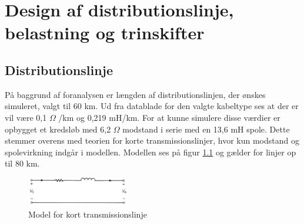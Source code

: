 
\chapter{Design af distributionslinje, belastning og trinskifter}

\section{Distributionslinje}
På baggrund af foranalysen er længden af distributionslinjen, der ønskes simuleret, valgt til 60 km. Ud fra datablade for den valgte kabeltype ses at der er vil være 0,1 $\Omega$ /km og 0,219 mH/km. For at kunne simulere disse værdier er opbygget et kredsløb med 6,2 $\Omega$ modstand i serie med en 13,6 mH spole. Dette stemmer overens med teorien for korte transmissionslinjer, hvor kun modstand og spolevirkning indgår i modellen. Modellen ses på figur \ref{fig:Kortlinjemodel} og gælder for linjer op til 80 km. 

\begin{figure}[htbp] %
	\centering
	\includegraphics[width=0.4\textwidth]{Figure/Kortlinjemodel2}
	\caption{Model for kort transmissionslinje}
	\label{fig:Kortlinjemodel}
\end{figure}



